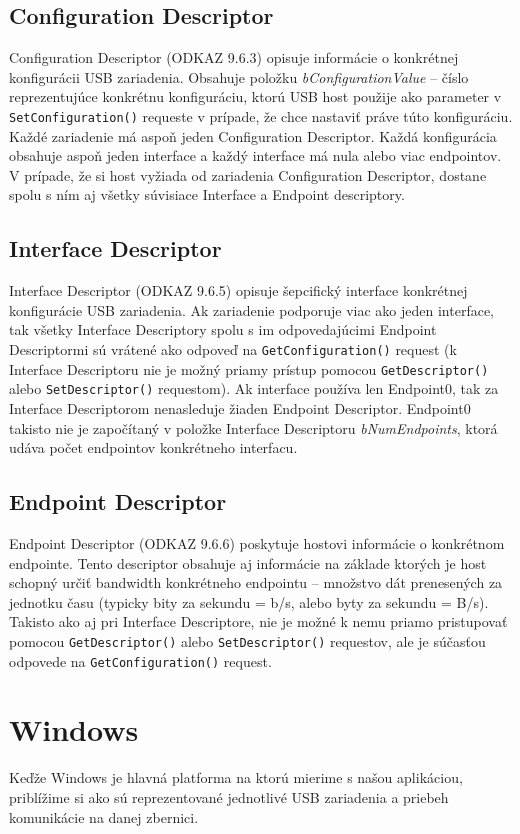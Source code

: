 \subsection*{Configuration Descriptor}
Configuration Descriptor (ODKAZ 9.6.3) opisuje informácie o konkrétnej konfigurácii USB zariadenia. Obsahuje položku \textit{bConfigurationValue} -- číslo reprezentujúce konkrétnu konfiguráciu, ktorú USB host použije ako parameter v \texttt{SetConfiguration()} requeste v prípade, že chce nastaviť práve túto konfiguráciu. Každé zariadenie má aspoň jeden Configuration Descriptor. Každá konfigurácia obsahuje aspoň jeden interface a každý interface má nula alebo viac endpointov. V prípade, že si host vyžiada od zariadenia Configuration Descriptor, dostane spolu s ním aj všetky súvisiace Interface a Endpoint descriptory.


\subsection*{Interface Descriptor}
Interface Descriptor (ODKAZ 9.6.5) opisuje šepcifický interface konkrétnej konfigurácie USB zariadenia. Ak zariadenie podporuje viac ako jeden interface, tak všetky Interface Descriptory spolu s im odpovedajúcimi Endpoint Descriptormi sú vrátené ako odpoveď na \texttt{GetConfiguration()} request (k Interface Descriptoru nie je možný priamy prístup pomocou \texttt{GetDescriptor()} alebo \texttt{SetDescriptor()} requestom). Ak interface používa len Endpoint0, tak za Interface Descriptorom nenasleduje žiaden Endpoint Descriptor. Endpoint0 takisto nie je započítaný v položke Interface Descriptoru \textit{bNumEndpoints}, ktorá udáva počet endpointov konkrétneho interfacu.


\subsection*{Endpoint Descriptor}
Endpoint Descriptor (ODKAZ 9.6.6) poskytuje hostovi informácie o konkrétnom endpointe. Tento descriptor obsahuje aj informácie na základe ktorých je host schopný určiť bandwidth konkrétneho endpointu -- množstvo dát prenesených za jednotku času (typicky bity za sekundu = b/s, alebo byty za sekundu = B/s). Takisto ako aj  pri Interface Descriptore, nie je možné k nemu priamo pristupovať pomocou \texttt{GetDescriptor()} alebo \texttt{SetDescriptor()} requestov, ale je súčasťou odpovede na \texttt{GetConfiguration()} request.



\section{Windows}
Keďže Windows je hlavná platforma na ktorú mierime s našou aplikáciou, priblížime si ako sú reprezentované jednotlivé USB zariadenia a priebeh komunikácie na danej zbernici.






